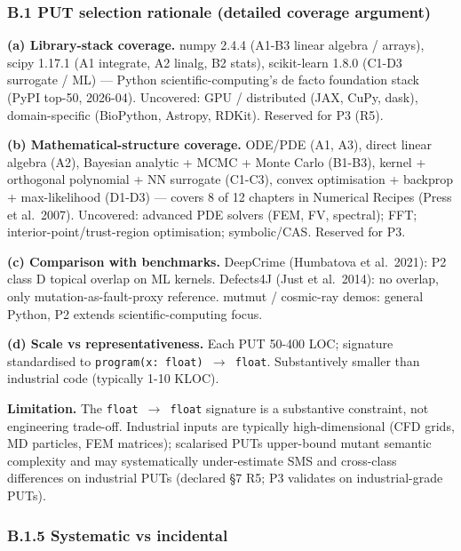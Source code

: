 \documentclass[review,12pt,authoryear]{elsarticle}
\begin{document}
\subsubsection{B.1 PUT selection rationale (detailed coverage
argument)}\label{b.1-put-selection-rationale-detailed-coverage-argument}

\textbf{(a) Library-stack coverage.} numpy 2.4.4 (A1-B3 linear algebra /
arrays), scipy 1.17.1 (A1 integrate, A2 linalg, B2 stats), scikit-learn
1.8.0 (C1-D3 surrogate / ML) --- Python scientific-computing's de facto
foundation stack (PyPI top-50, 2026-04). Uncovered: GPU / distributed
(JAX, CuPy, dask), domain-specific (BioPython, Astropy, RDKit). Reserved
for P3 (R5).

\textbf{(b) Mathematical-structure coverage.} ODE/PDE (A1, A3), direct
linear algebra (A2), Bayesian analytic + MCMC + Monte Carlo (B1-B3),
kernel + orthogonal polynomial + NN surrogate (C1-C3), convex
optimisation + backprop + max-likelihood (D1-D3) --- covers 8 of 12
chapters in Numerical Recipes (Press et al.~2007). Uncovered: advanced
PDE solvers (FEM, FV, spectral); FFT; interior-point/trust-region
optimisation; symbolic/CAS. Reserved for P3.

\textbf{(c) Comparison with benchmarks.} DeepCrime (Humbatova et
al.~2021): P2 class D topical overlap on ML kernels. Defects4J (Just et
al.~2014): no overlap, only mutation-as-fault-proxy reference. mutmut /
cosmic-ray demos: general Python, P2 extends scientific-computing focus.

\textbf{(d) Scale vs representativeness.} Each PUT 50-400 LOC; signature
standardised to \texttt{program(x:\ float)\ $\to$\ float}. Substantively
smaller than industrial code (typically 1-10 KLOC).

\textbf{Limitation.} The \texttt{float\ $\to$\ float} signature is a
substantive constraint, not engineering trade-off. Industrial inputs are
typically high-dimensional (CFD grids, MD particles, FEM matrices);
scalarised PUTs upper-bound mutant semantic complexity and may
systematically under-estimate SMS and cross-class differences on
industrial PUTs (declared §7 R5; P3 validates on industrial-grade PUTs).

\subsubsection{B.1.5 Systematic vs
incidental}\label{b.1.5-systematic-vs-incidental}
\end{document}
